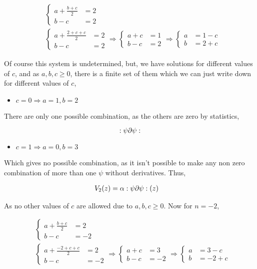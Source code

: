 \begin{align*}
    &\begin{cases}
        a+\frac{b+c}{2}&=2\\
        b-c&=2
    \end{cases}\\
    &\begin{cases}
        a+\frac{2+c+c}{2}&=2\\
        b-c&=2
    \end{cases}\Rightarrow
    \begin{cases}
        a+c&=1\\
        b-c&=2
    \end{cases}\Rightarrow
    \begin{cases}
        a&=1-c\\
        b&=2+c
    \end{cases}
\end{align*}

Of course this system is undetermined, but, we have solutions for different values of $c$, and as $a,b,c\geq0$, there is a finite set of them which we can just 
write down for different values of $c$,

\begin{itemize}
    \item $c=0\Rightarrow a=1,b=2$
\end{itemize}

There are only one possible combination, as the others are zero by statistics,

$$:\psi\partial\psi:$$

\begin{itemize}
    \item $c=1\Rightarrow a=0,b=3$
\end{itemize}

Which gives no possible combination, as it isn't possible to make any non zero combination of more than one $\psi$ 
without derivatives. Thus,

\begin{align*}
    V_2\qty(z)&=\alpha:\psi\partial\psi:\qty(z)
\end{align*}

As no other values of $c$ are allowed due to $a,b,c\geq0$. Now for $n=-2$,

\begin{align*}
    &\begin{cases}
        a+\frac{b+c}{2}&=2\\
        b-c&=-2
    \end{cases}\\
    &\begin{cases}
        a+\frac{-2+c+c}{2}&=2\\
        b-c&=-2
    \end{cases}\Rightarrow
    \begin{cases}
        a+c&=3\\
        b-c&=-2
    \end{cases}\Rightarrow
    \begin{cases}
        a&=3-c\\
        b&=-2+c
    \end{cases}
\end{align*}

